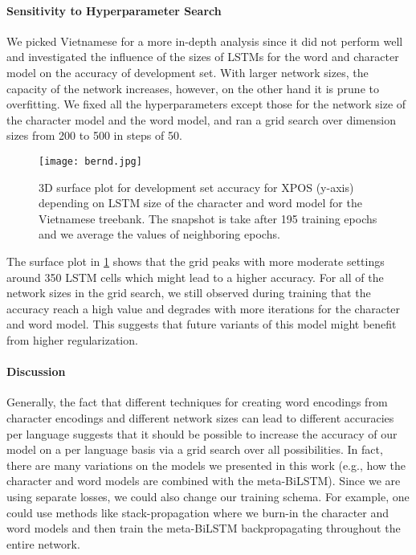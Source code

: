 \documentclass[11pt,a4paper]{article}
\begin{document}
\paragraph{Sensitivity to Hyperparameter Search}

We picked Vietnamese for a more in-depth analysis since it did not perform well and investigated the influence of the sizes of LSTMs for the word and character model on the accuracy of development set. With larger network sizes, the capacity of the network increases, however, on the other hand it is prune to overfitting. We fixed all the hyperparameters except those for the network size of the character model and the word model, and ran a grid search over dimension sizes from 200 to 500 in steps of 50. 
\begin{figure}[t!]
\vspace{-0.7cm}
\texttt{[image: bernd.jpg]}
\caption{3D surface plot for development set accuracy for XPOS (y-axis) depending on LSTM size of the character and word model for the Vietnamese treebank. The snapshot is take after 195 training epochs and we average the values of neighboring epochs.
}
\label{figure:3d-vietnamese}
\vspace{-0.3cm}
\end{figure}
The surface plot in \ref{figure:3d-vietnamese} shows that the grid peaks with more moderate settings around 350 LSTM cells which might lead to a higher accuracy. For all of the network sizes in the grid search, we still observed during training that the accuracy reach a high value and degrades with more iterations for the character and word model. This suggests that future variants of this model might benefit from higher regularization.


\paragraph{Discussion}
\label{sec:discussion}

Generally, the fact that different techniques for creating word encodings from character encodings and different network sizes can lead to different accuracies per language suggests that it should be possible to increase the accuracy of our model on a per language basis via a grid search over all possibilities. 
In fact, there are many variations on the models we presented in this work (e.g., how the character and word models are combined with the meta-BiLSTM). 
Since we are using separate losses, we could also change our training schema. For example, one could use methods like stack-propagation \cite{zhang2016stack} where we burn-in the character and word models and then train the meta-BiLSTM backpropagating throughout the entire network.
\end{document}
